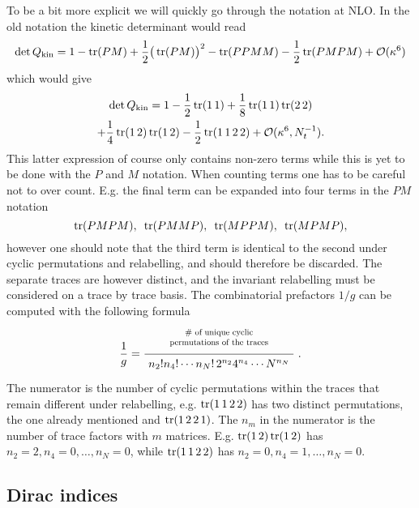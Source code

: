 To be a bit more explicit we will quickly go through the notation at NLO. In the
old notation the kinetic determinant would read
%
\begin{equation} \label{eq:expanded_pm_notation}
  \det Q_{\text{kin}} = 1 - \operatorname{tr}(PM) + \frac{1}{2} \big(\operatorname{tr}(PM)\big)^2 - \operatorname{tr}(PPMM) -
    \frac{1}{2} \operatorname{tr}(PMPM) + \mathcal{O}(\kappa^6)
\end{equation}
%
which would give
%
\begin{multline}
  \det Q_{\text{kin}} = 
    1 - \frac{1}{2} \operatorname{tr}(1\,1) + \frac{1}{8} \operatorname{tr}(1\,1) \operatorname{tr}(2\,2) \\
    + \frac{1}{4}\operatorname{tr} (1\,2) \operatorname{tr} (1\,2) - \frac{1}{2} \operatorname{tr}(1\,1\,2\,2) +
    \mathcal{O}(\kappa^6, N_t^{-1}).
\end{multline}
%
This latter expression of course only contains non-zero terms while this is yet
to be done with the $P$ and $M$ notation. When counting terms one has to be
careful not to over count. E.g. the final term can be expanded into four terms
in the $PM$ notation
%
\begin{equation}
  \operatorname{tr}(PMPM), \hskip.5em \operatorname{tr}(PMMP), \hskip.5em \operatorname{tr}(MPPM), \hskip.5em \operatorname{tr}(MPMP),
\end{equation}
%
however one should note that the third term is identical to the second under
cyclic permutations and relabelling, and should therefore be discarded. The
separate traces are however distinct, and the invariant relabelling must be
considered on a trace by trace basis. The combinatorial prefactors $1/g$ can be
computed with the following formula
%
\begin{equation}
  \frac{1}{g}=
    \frac{%
      \tikz \node [anchor=north east,scale=0.75,align=center] {\# of unique cyclic \\ permutations of the traces};
    }{%
      \tikz \node {$n_2!n_4!\cdots{}n_N!\, 2^{n_2} 4^{n_4} \cdots N^{n_N}$};
    } \;.
\end{equation}
%
The numerator is the number of cyclic permutations within the traces that
remain different under relabelling, e.g. $\operatorname{tr}(1\,1\,2\,2)$ has two distinct
permutations, the one already mentioned and $\operatorname{tr}(1\,2\,2\,1)$. The $n_m$ in the
numerator is the number of trace factors with $m$ matrices. E.g.
$\operatorname{tr}(1\,2)\operatorname{tr}(1\,2)$ has $n_2 = 2, n_4 = 0, \dots, n_N = 0$, while
$\operatorname{tr}(1\,1\,2\,2)$ has $n_2 = 0, n_4 = 1, \dots, n_N = 0$.

\subsection{Dirac indices}

